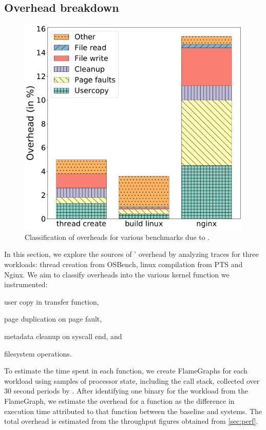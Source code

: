 \documentclass[letterpaper,twocolumn,10pt]{article}
\begin{document}
\subsection{Overhead breakdown}

\begin{figure}
  \centering
  \includegraphics[width=\linewidth]{img/overhead.pdf}
  \caption{Classification of overheads for various benchmarks due to \midas.}
  \label{fig:overhead_class}
\end{figure}

In this section, we explore the sources of \midas' overhead by analyzing 
 traces for three workloads: thread creation from OSBench, linux 
compilation from PTS and Nginx. 
We aim to classify overheads into the various kernel function we instrumented:
\begin{inparaenum}
\item user copy in transfer function,
\item page duplication on page fault,
\item metadata cleanup on syscall end, and
\item filesystem operations.
\end{inparaenum}

To estimate the time spent in each function, we create FlameGraphs for 
each workload\cite{GreggFlameGraph} using samples of processor state, including
the call stack, collected over 30 second periods by .
After identifying one binary for the workload from the FlameGraph, we estimate 
the overhead for a function as the difference in execution time attributed to 
that function between the baseline and \midas systems.
The total overhead is estimated from the throughput figures obtained from 
\autoref{sec:perf}.
\end{document}
